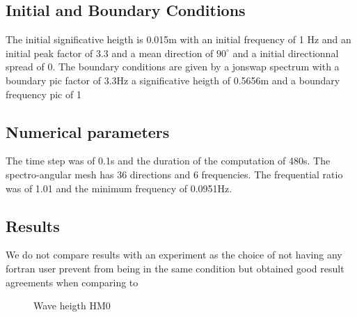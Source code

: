 %
%
\subsection{Initial and Boundary Conditions}
%
    The initial  significative heigth is 0.015m with an initial frequency of 1 Hz and an initial peak factor of 3.3 and a mean direction of $90^{\circ}$ and a initial directionnal spread of 0.
The boundary conditions are given by a jonswap spectrum with a boundary pic factor of 3.3Hz a significative heigth of 0.5656m and a boundary frequency pic of 1

%
%
\subsection{Numerical parameters}
%
The time step was of 0.1s and the duration of the computation of 480s. The spectro-angular mesh has 36 directions and 6 frequencies. The frequential ratio was of 1.01 and the minimum frequency of 0.0951Hz.

\subsection{Results}
We do not compare results with an experiment as the choice of not having any fortran user prevent from being in the same condition but \cite{Bacchi2014} obtained good result agreements when comparing to \cite{Mendez2004}
\begin{figure} [!h]
\centering
{}
 \caption{Wave heigth HM0}
\label{resVeget}
\end{figure}

